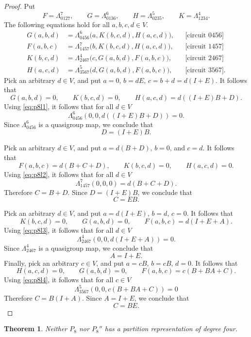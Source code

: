 \documentclass[preprint,12pt]{elsarticle}
\newtheorem{theorem}{Theorem}[section]
\theoremstyle{definition}
\newcommand{\circuittag}[1]{\text{[circuit $#1$]}}
\begin{document}
\begin{proof}
	Put
	\[
	F=\Lambda_{0127}^{7},\qquad G=\Lambda_{0136}^{6},\qquad
	H=\Lambda_{0235}^{5},\qquad K=\Lambda_{1234}^{4}.
	\]
	The following equations hold for all $a,b,c,d \in V$.
	\begin{align}
		G(a,b,d)&=\Lambda_{0456}^{6}\bigl(a,K(b,c,d),H(a,c,d)\bigr),
		&&\circuittag{0456}\label{eq:p8l1}\\
		F(a,b,c)&=\Lambda_{1457}^{7}\bigl(b,K(b,c,d),H(a,c,d)\bigr),
		&&\circuittag{1457}\label{eq:p8l2}\\
		K(b,c,d)&=\Lambda_{2467}^{4}\bigl(c,G(a,b,d),F(a,b,c)\bigr),
		&&\circuittag{2467}\label{eq:p8l3}\\
		H(a,c,d)&=\Lambda_{3567}^{5}\bigl(d,G(a,b,d),F(a,b,c)\bigr),
		&&\circuittag{3567}.\label{eq:p8l4}
	\end{align}
Pick an arbitrary $d \in V$, and put $a = 0$, $b = dE$,  $c = b+d=d(I+E)$. It follows
that
\[
G(a,b,d) = 0, \qquad K(b,c,d) = 0, \qquad H(a,c,d) = d((I+E)B + D).
\]
Using \eqref{eq:p8l1}, it follows that for all $d \in V$
\[
\Lambda_{0456}^6(0,0,d((I+E)B + D))=0.
\]
Since $\Lambda_{0456}^6$ is a quasigroup map, we conclude that 
\[
\boxed{D = (I+E)B}.
\]

Pick an arbitrary $d \in V$, and put $a=d(B+D)$, $b=0$, and
$c=d$. It follows
that
\[
F(a,b,c) = d(B+C+D), \qquad K(b,c,d) = 0, \qquad H(a,c,d) = 0.
\]
Using \eqref{eq:p8l2}, it follows that for all $d \in V$
\[
\Lambda_{1457}^7(0,0,0) = d(B+C+D).
\]
Therefore $C = B+D$. Since $D = (I+E)B$, we conclude that
\[
\boxed{C = EB}.
\]

Pick an arbitrary $d \in V$, and put $a = d(I+E)$, $b = d$, $c = 0$. It follows that
\[
K(b,c,d) = 0, \qquad G(a,b,d) = 0, \qquad F(a,b,c) = d(I + E + A).
\]
Using \eqref{eq:p8l3}, it follows that for all $d \in V$
\[
\Lambda_{2467}^4(0,0,d(I+E+A)) = 0.
\]
Since $\Lambda_{2467}^4$ is a quasigroup map, we conclude that
\[
\boxed{A = I + E}.
\]
Finally, pick an arbitrary $c \in V$, and put $a = cB$, $b = cB$, $d = 0$. It follows that
\[
H(a,c,d) = 0, \qquad G(a,b,d) = 0, \qquad F(a,b,c) = c(B + BA + C).
\]
Using \eqref{eq:p8l4}, it follows that for all $c \in V$
\[
\Lambda_{3567}^5(0,0,c(B+BA+C)) = 0
\]
Therefore $C = B(I + A)$. Since $A = I+E$, we conclude that
\[
\boxed{C = BE}.
\]
\end{proof}

\begin{theorem}\label{lem:p8}
Neither $P_8$ nor $P_8''$ has a partition representation of degree four.
\end{theorem}
\end{document}
